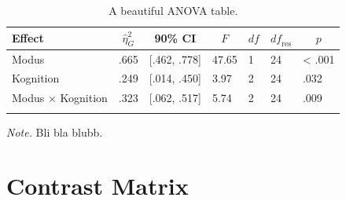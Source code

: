 \documentclass[
  doc,floatsintext]{apa6}
\newenvironment{Shaded}{\begin{snugshade}}{\end{snugshade}}
\newcommand{\DecValTok}[1]{\textcolor[rgb]{0.00,0.00,0.81}{#1}}
\newcommand{\FunctionTok}[1]{\textcolor[rgb]{0.13,0.29,0.53}{\textbf{#1}}}
\newcommand{\NormalTok}[1]{#1}
\newcommand{\OtherTok}[1]{\textcolor[rgb]{0.56,0.35,0.01}{#1}}
\newcommand{\SpecialCharTok}[1]{\textcolor[rgb]{0.81,0.36,0.00}{\textbf{#1}}}
\begin{document}
\begin{table}[tbp]

\begin{center}
\begin{threeparttable}

\caption{\label{tab:tabanova}A beautiful ANOVA table.}

\begin{tabular}{lllllll}
\toprule
Effect & \multicolumn{1}{c}{$\hat{\eta}^2_G$} & \multicolumn{1}{c}{90\% CI} & \multicolumn{1}{c}{$F$} & \multicolumn{1}{c}{$\mathit{df}$} & \multicolumn{1}{c}{$\mathit{df}_{\mathrm{res}}$} & \multicolumn{1}{c}{$p$}\\
\midrule
Modus & .665 & {}[.462, .778] & 47.65 & 1 & 24 & < .001\\
Kognition & .249 & {}[.014, .450] & 3.97 & 2 & 24 & .032\\
Modus $\times$ Kognition & .323 & {}[.062, .517] & 5.74 & 2 & 24 & .009\\
\bottomrule
\addlinespace
\end{tabular}

\begin{tablenotes}[para]
\normalsize{\textit{Note.} Bli bla blubb.}
\end{tablenotes}

\end{threeparttable}
\end{center}

\end{table}

\hypertarget{contrast-matrix}{%
\section{Contrast Matrix}\label{contrast-matrix}}

\begin{Shaded}
\end{Shaded}
\end{document}
